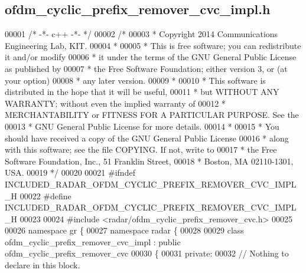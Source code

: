 \subsection{ofdm\+\_\+cyclic\+\_\+prefix\+\_\+remover\+\_\+cvc\+\_\+impl.\+h}
\label{ofdm__cyclic__prefix__remover__cvc__impl_8h_source}

\begin{DoxyCode}
00001 \textcolor{comment}{/* -*- c++ -*- */}
00002 \textcolor{comment}{/* }
00003 \textcolor{comment}{ * Copyright 2014 Communications Engineering Lab, KIT.}
00004 \textcolor{comment}{ * }
00005 \textcolor{comment}{ * This is free software; you can redistribute it and/or modify}
00006 \textcolor{comment}{ * it under the terms of the GNU General Public License as published by}
00007 \textcolor{comment}{ * the Free Software Foundation; either version 3, or (at your option)}
00008 \textcolor{comment}{ * any later version.}
00009 \textcolor{comment}{ * }
00010 \textcolor{comment}{ * This software is distributed in the hope that it will be useful,}
00011 \textcolor{comment}{ * but WITHOUT ANY WARRANTY; without even the implied warranty of}
00012 \textcolor{comment}{ * MERCHANTABILITY or FITNESS FOR A PARTICULAR PURPOSE.  See the}
00013 \textcolor{comment}{ * GNU General Public License for more details.}
00014 \textcolor{comment}{ * }
00015 \textcolor{comment}{ * You should have received a copy of the GNU General Public License}
00016 \textcolor{comment}{ * along with this software; see the file COPYING.  If not, write to}
00017 \textcolor{comment}{ * the Free Software Foundation, Inc., 51 Franklin Street,}
00018 \textcolor{comment}{ * Boston, MA 02110-1301, USA.}
00019 \textcolor{comment}{ */}
00020 
00021 \textcolor{preprocessor}{#ifndef INCLUDED\_RADAR\_OFDM\_CYCLIC\_PREFIX\_REMOVER\_CVC\_IMPL\_H}
00022 \textcolor{preprocessor}{#define INCLUDED\_RADAR\_OFDM\_CYCLIC\_PREFIX\_REMOVER\_CVC\_IMPL\_H}
00023 
00024 \textcolor{preprocessor}{#include <radar/ofdm_cyclic_prefix_remover_cvc.h>}
00025 
00026 \textcolor{keyword}{namespace }gr \{
00027   \textcolor{keyword}{namespace }radar \{
00028 
00029     \textcolor{keyword}{class }ofdm_cyclic_prefix_remover_cvc_impl : \textcolor{keyword}{public} 
      ofdm_cyclic_prefix_remover_cvc
00030     \{
00031      \textcolor{keyword}{private}:
00032       \textcolor{comment}{// Nothing to declare in this block.}

\end{DoxyCode}
